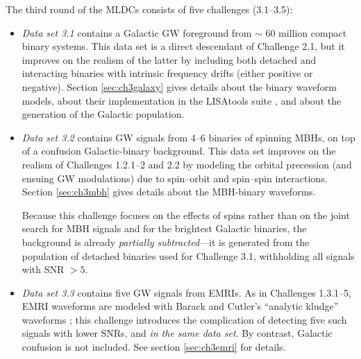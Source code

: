 \documentclass{iopart}
\begin{document}
The third round of the MLDCs consists of five challenges (3.1--3.5):
%
\begin{itemize}
%
\item \textit{Data set 3.1} contains a Galactic GW foreground from $\sim$ 60 million compact binary systems.
This data set is a direct descendant of Challenge 2.1, but it improves on the realism of the latter by including both detached and interacting binaries with intrinsic frequency drifts (either positive or negative). Section \ref{sec:ch3galaxy} gives details about the binary waveform models, about their implementation in the LISAtools suite \cite{lisatools}, and about the generation of the Galactic population. 
%
\item \textit{Data set 3.2} contains GW signals from 4--6 binaries of spinning MBHs, on top of a confusion Galactic-binary background. This data set improves on the realism of Challenges 1.2.1--2 and 2.2 by modeling the orbital precession (and ensuing GW modulations) due to spin--orbit and spin--spin interactions. Section \ref{sec:ch3mbh} gives details about the MBH-binary waveforms.

Because this challenge focuses on the effects of spins rather than on the joint search for MBH signals and for the brightest Galactic binaries, the background is already \emph{partially subtracted}---it is generated from the population of detached binaries used for Challenge 3.1, withholding all signals with SNR $> 5$.
%
\item \textit{Data set 3.3} contains five GW signals from EMRIs. As in Challenges 1.3.1--5, EMRI waveforms are modeled with Barack and Cutler's ``analytic kludge'' waveforms \cite{barackcutler}; this challenge introduces the complication of detecting five such signals with lower SNRs, and \emph{in the same data set}. By contrast, Galactic confusion is not included. See section \ref{sec:ch3emri} for details.
%
\end{itemize}
%
\end{document}
